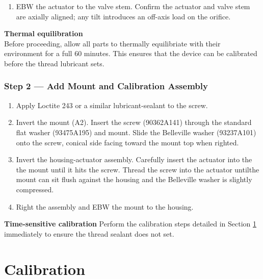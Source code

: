 \documentclass[12pt, letterpaper]{report}%
\newcounter{mycounter}           %
\newcounter{sub}[mycounter]      %
\begin{document}
\begin{enumerate}[itemsep=4pt]
	\item EBW the actuator to the valve stem.
				Confirm the actuator and valve stem are axially
				aligned; any tilt introduces an off-axis load on the orifice.
\end{enumerate}

\begin{notebox}
\textbf{Thermal equilibration}\\
Before proceeding, allow all parts to thermally equilibriate with their environment for a full
60 minutes. This ensures that the device can be calibrated before the thread lubricant sets.
\end{notebox}

\subsubsection*{Step 2 --- Add Mount and Calibration Assembly}

\begin{enumerate}[itemsep=4pt]
	\item Apply Loctite 243 or a similar lubricant-sealant to the screw.
	\item Invert the mount (A2). Insert the screw (90362A141) through the
				standard flat washer (93475A195) and mount.
				Slide the Belleville washer (93237A101) onto the screw,
				conical side facing toward the mount top when righted.
	\item Invert the housing-actuator assembly. Carefully insert the actuator into the
				the mount until it hits the screw. Thread the screw into the actuator untilthe mount
				can sit flush against the housing and the Belleville washer is slightly compressed.
	\item Right the assembly and EBW the mount to the housing.
\end{enumerate}

\begin{notebox}
\textbf{Time-sensitive calibration}
Perform the calibration steps detailed in Section \ref{sec:calibration} immediately
to ensure the thread sealant does not set.
\end{notebox}

\section{Calibration}
\label{sec:calibration}
\end{document}
